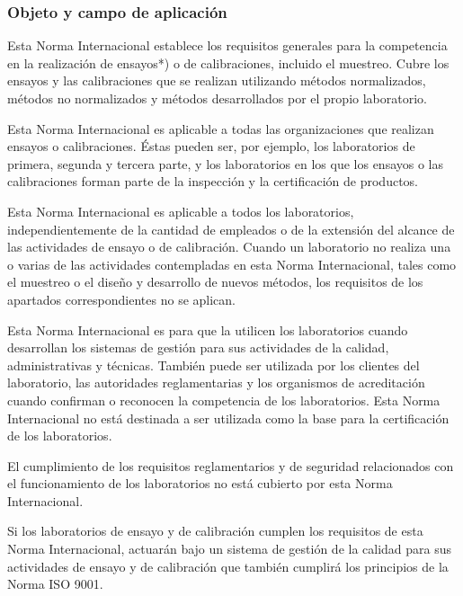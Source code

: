\newpage
\thispagestyle{plain}
			
	\subsubsection{Objeto y campo de aplicación}
		\par
			Esta Norma Internacional establece los requisitos generales para la competencia en la realización de
			ensayos*) o de calibraciones, incluido el muestreo. Cubre los ensayos y las calibraciones que se realizan
			utilizando métodos normalizados, métodos no normalizados y métodos desarrollados por el propio laboratorio.
			
		\par \noindent
			Esta Norma Internacional es aplicable a todas las organizaciones que realizan ensayos o calibraciones.
			Éstas pueden ser, por ejemplo, los laboratorios de primera, segunda y tercera parte, y los laboratorios en los que los ensayos o las calibraciones forman parte de la inspección y la certificación de productos.
			
		\par \noindent
			Esta Norma Internacional es aplicable a todos los laboratorios, independientemente de la cantidad de
			empleados o de la extensión del alcance de las actividades de ensayo o de calibración. Cuando un laboratorio no realiza una o varias de las actividades contempladas en esta Norma Internacional, tales como el muestreo o el diseño y desarrollo de nuevos métodos, los requisitos de los apartados correspondientes no se aplican.
	
		\par \noindent
			Esta Norma Internacional es para que la utilicen los laboratorios cuando desarrollan los sistemas de
			gestión para sus actividades de la calidad, administrativas y técnicas. También puede ser utilizada por los clientes del laboratorio, las autoridades reglamentarias y los organismos de acreditación cuando confirman o reconocen la competencia de los laboratorios. Esta Norma Internacional no está destinada a ser utilizada
			como la base para la certificación de los laboratorios.
			
		\par \noindent
			El cumplimiento de los requisitos reglamentarios y de seguridad relacionados con el funcionamiento de
			los laboratorios no está cubierto por esta Norma Internacional.
			
		\par \noindent
			Si los laboratorios de ensayo y de calibración cumplen los requisitos de esta Norma Internacional,
			actuarán bajo un sistema de gestión de la calidad para sus actividades de ensayo y de calibración que
			también cumplirá los principios de la Norma ISO 9001.

